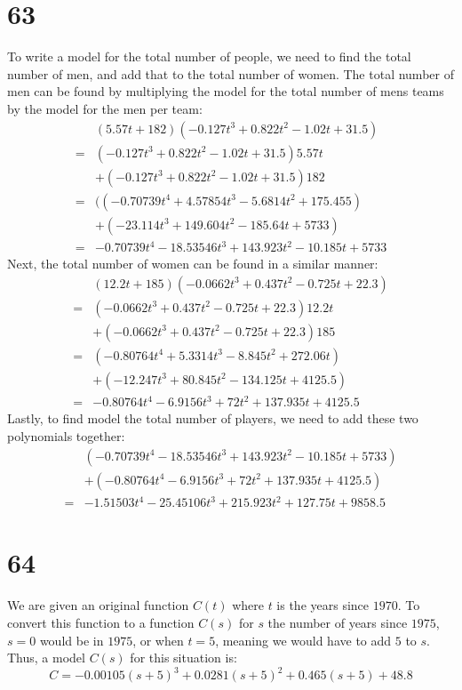 \documentclass{article}
\theoremstyle{definition}
\begin{document}
\section*{63}
To write a model for the total number of people, we need to find the total number of men, and add that to the total number of women. The total number 
of men can be found by multiplying the model for the total number of mens teams by the model for the men per team:
\[
\begin{array}{rl}
	& (5.57t+182)(-0.127t^3+0.822t^2-1.02t+31.5) \\
=	& (-0.127t^3+0.822t^2-1.02t+31.5)5.57t \\
	& +(-0.127t^3+0.822t^2-1.02t+31.5)182 \\
=	& ((-0.70739t^4+4.57854t^3-5.6814t^2+175.455) \\
	& +(-23.114t^3+149.604t^2-185.64t+5733) \\
=	& -0.70739t^4-18.53546t^3+143.923t^2-10.185t+5733
\end{array}
\]
Next, the total number of women can be found in a similar manner:
\[
\begin{array}{rl}
	& (12.2t+185)(-0.0662t^3+0.437t^2-0.725t+22.3) \\
=	& (-0.0662t^3+0.437t^2-0.725t+22.3)12.2t \\
	& +(-0.0662t^3+0.437t^2-0.725t+22.3)185 \\
=	& (-0.80764t^4+5.3314t^3-8.845t^2+272.06t) \\
	& +(-12.247t^3+80.845t^2-134.125t+4125.5) \\
=	& -0.80764t^4-6.9156t^3+72t^2+137.935t+4125.5
\end{array}
\]
Lastly, to find model the total number of players, we need to add these two polynomials together:
\[
\begin{array}{rl}
	& (-0.70739t^4-18.53546t^3+143.923t^2-10.185t+5733) \\
	& +(-0.80764t^4-6.9156t^3+72t^2+137.935t+4125.5) \\
=	& -1.51503t^4-25.45106t^3+215.923t^2+127.75t+9858.5 
\end{array}
\]

\section*{64}
We are given an original function $C(t)$ where $t$ is the years since $1970$. To convert this function to a function $C(s)$ for $s$ the number 
of years since $1975$, $s=0$ would be in $1975$, or when $t=5$, meaning we would have to add $5$ to $s$. Thus, a model $C(s)$ for this situation is:
\[ C=-0.00105(s+5)^3+0.0281(s+5)^2+0.465(s+5)+48.8 \]
\end{document}
